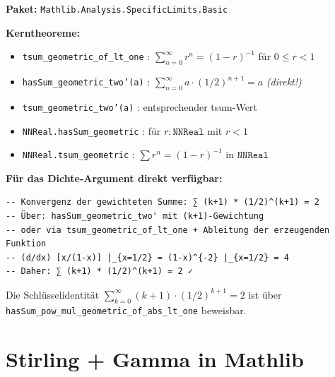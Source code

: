 \documentclass[12pt,a4paper]{article}
\newcommand{\Mathlib}[1]{\texttt{Mathlib.\allowbreak #1}}
\begin{document}
\begin{tcolorbox}[vorhanden,
  title={Formalisiert: Geometrische Reihen (inkl. $x=1/2$-Spezialfall)}]
\textbf{Paket:} \Mathlib{Analysis.SpecificLimits.Basic}

\medskip
\textbf{Kerntheoreme:}
\begin{itemize}[nosep]
  \item \texttt{tsum\_geometric\_of\_lt\_one} : $\sum_{n=0}^\infty r^n = (1-r)^{-1}$ für $0\leq r < 1$
  \item \texttt{hasSum\_geometric\_two'(a)} :
    $\sum_{n=0}^\infty a\cdot (1/2)^{n+1} = a$ \quad \textit{(direkt!)}
  \item \texttt{tsum\_geometric\_two'(a)} : entsprechender tsum-Wert
  \item \texttt{NNReal.hasSum\_geometric} : für $r:\texttt{NNReal}$ mit $r < 1$
  \item \texttt{NNReal.tsum\_geometric} : $\sum r^n = (1-r)^{-1}$ in $\texttt{NNReal}$
\end{itemize}

\textbf{Für das Dichte-Argument direkt verfügbar:}
\begin{lstlisting}[language=Lean4]
-- Konvergenz der gewichteten Summe: ∑ (k+1) * (1/2)^(k+1) = 2
-- Über: hasSum_geometric_two' mit (k+1)-Gewichtung
-- oder via tsum_geometric_of_lt_one + Ableitung der erzeugenden Funktion
-- (d/dx) [x/(1-x)] |_{x=1/2} = (1-x)^{-2} |_{x=1/2} = 4
-- Daher: ∑ (k+1) * (1/2)^(k+1) = 2 ✓
\end{lstlisting}

Die Schlüsselidentität $\sum_{k=0}^\infty (k+1)\cdot (1/2)^{k+1} = 2$
ist über \texttt{hasSum\_pow\_mul\_geometric\_of\_abs\_lt\_one} beweisbar.
\end{tcolorbox}

\section{Stirling + Gamma in Mathlib}
\label{sec:stirling}
\end{document}
